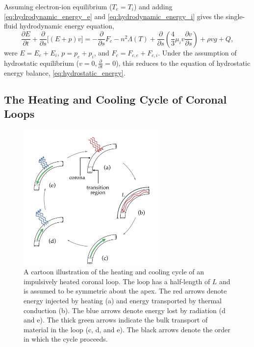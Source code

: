 Assuming electron-ion equilibrium ($T_e=T_i$) and adding \autoref{eq:hydrodynamic_energy_e} and \autoref{eq:hydrodynamic_energy_i} gives the single-fluid hydrodynamic energy equation,
\begin{equation}\label{eq:hydrodynamic_energy}
    \frac{\partial E}{\partial t} + \frac{\partial}{\partial s}\lbrack(E+p)v\rbrack = - \frac{\partial}{\partial s}F_c - n^2\Lambda(T) + \frac{\partial}{\partial s}\left(\frac{4}{3}\mu_iv\frac{\partial v}{\partial s}\right) +\rho vg + Q, 
\end{equation}
were $E=E_e + E_i$, $p=p_e+p_i$, and $F_c=F_{c,e} + F_{c,i}$. Under the  assumption of hydrostatic equilibrium ($v=0,\frac{\partial}{\partial t}=0$), this reduces to the equation of hydrostatic energy balance, \autoref{eq:hydrostatic_energy}.

\subsection{The Heating and Cooling Cycle of Coronal Loops}\label{sec:heating-cooling-cycle}

\begin{figure}
    \centering
    \includegraphics[width=0.65\textwidth]{chapter2/figures/heating-cooling-cycle-cartoon.pdf}
    \caption{A cartoon illustration of the heating and cooling cycle of an impulsively heated coronal loop. The loop has a half-length of $L$ and is assumed to be symmetric about the apex. The red arrows denote energy injected by heating (a) and energy transported by thermal conduction (b). The blue arrows denote energy lost by radiation (d and e). The thick green arrows indicate the bulk transport of material in the loop (c, d, and e). The black arrows denote the order in which the cycle proceeds.}
    \label{fig:heating-cooling-cycle-cartoon}
\end{figure}

